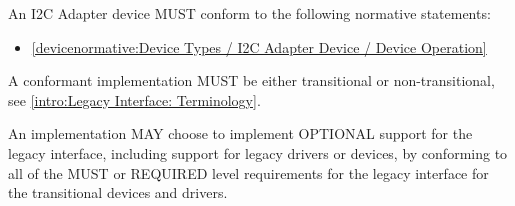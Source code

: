 \label{sec:Conformance / Device Conformance / I2C Adapter Device Conformance}

An I2C Adapter device MUST conform to the following normative statements:

\begin{itemize}
\item \ref{devicenormative:Device Types / I2C Adapter Device / Device Operation}
\end{itemize}

\label{sec:Conformance / Legacy Interface: Transitional Device and Transitional Driver Conformance}
A conformant implementation MUST be either transitional or
non-transitional, see \ref{intro:Legacy
Interface: Terminology}.

An implementation MAY choose to implement OPTIONAL support for the
legacy interface, including support for legacy drivers
or devices, by conforming to all of the MUST or
REQUIRED level requirements for the legacy interface
for the transitional devices and drivers.

